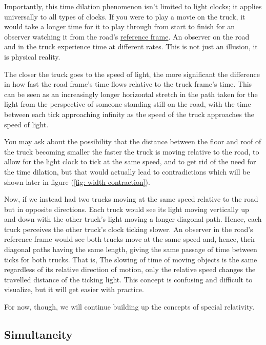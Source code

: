 Importantly, this time dilation phenomenon isn't limited to light clocks; it applies universally to all types of clocks.
If you were to play a movie on the truck, it would take a longer time for it to play through from start to finish for an observer watching it from the road's \hyperlink{def-Reference-frame}{reference frame}.
An observer on the road and in the truck experience time at different rates.
This is not just an illusion, it is physical reality.

The closer the truck goes to the speed of light, the more significant the difference in how fast the road frame's time flows relative to the truck frame's time.
This can be seen as an increasingly longer horizontal stretch in the path taken for the light from the perspective of someone standing still on the road, with the time between each tick approaching infinity as the speed of the truck approaches the speed of light.

You may ask about the possibility that the distance between the floor and roof of the truck becoming smaller the faster the truck is moving relative to the road, to allow for the light clock to tick at the same speed, and to get rid of the need for the time dilation, but that would actually lead to contradictions which will be shown later in figure (\ref{fig: width contraction}).

Now, if we instead had two trucks moving at the same speed relative to the road but in opposite directions.
Each truck would see its light moving vertically up and down with the other truck's light moving a longer diagonal path.
Hence, each truck perceives the other truck's clock ticking slower.
An observer in the road's reference frame would see both trucks move at the same speed and, hence, their diagonal paths having the same length, giving the same passage of time between ticks for both trucks.
That is, The slowing of time of moving objects is the same regardless of its relative direction of motion, only the relative speed changes the travelled distance of the ticking light.
This concept is confusing and difficult to visualize, but it will get easier with practice.

For now, though, we will continue building up the concepts of special relativity.



\subsection{Simultaneity} \label{subsect: Simultaneity}

